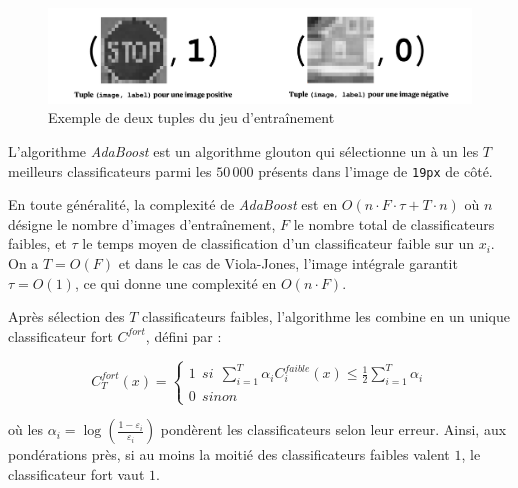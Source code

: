 \documentclass[12pt,a4paper]{article}
\begin{document}
\begin{figure}[t]
    \includegraphics[scale = 0.5]{exemples_jeu}
    \centering
    \caption{Exemple de deux tuples du jeu d'entraînement}
\end{figure}

L'algorithme \textit{AdaBoost} est un algorithme glouton qui sélectionne un à un les $T$ meilleurs classificateurs parmi les $50\,000$ présents dans l'image de \texttt{19px} de côté. 

En toute généralité, la complexité de \textit{AdaBoost} est en $O(n \cdot F \cdot \tau + T \cdot n)$ où $n$ désigne le nombre d'images d'entraînement, $F$ le nombre total de classificateurs faibles, et $\tau$ le temps moyen de classification d'un classificateur faible sur un $x_i$. On a $T = O(F)$ et dans le cas de Viola-Jones, l'image intégrale garantit $\tau = O(1)$, ce qui donne une complexité en $O(n \cdot F)$.

Après sélection des $T$ classificateurs faibles, l'algorithme les combine en un unique classificateur fort $C^{fort}$, défini par :

$$C_T^{fort}(x) = 
\begin{cases}
1 \:\: si \:\: \sum_{i=1}^T \alpha_i C_i^{faible}(x) \leq \frac{1}{2} \sum_{i=1}^T \alpha_i \\
0 \:\: sinon
\end{cases}$$

où les $\alpha_i = \log(\frac{1 - \varepsilon_i}{\varepsilon_i})$ pondèrent les classificateurs selon leur erreur. Ainsi, aux pondérations près, si au moins la moitié des classificateurs faibles valent $1$, le classificateur fort vaut $1$.
\end{document}
